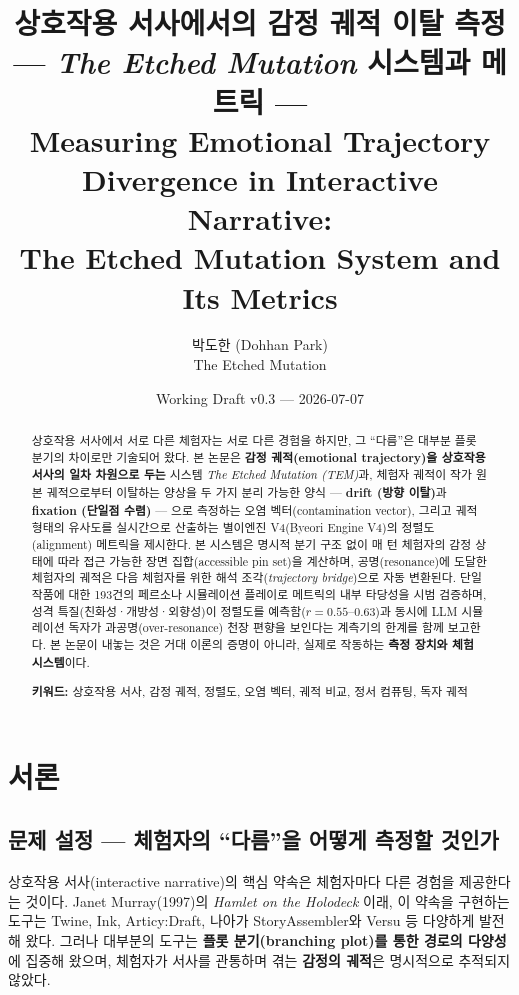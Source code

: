\documentclass[11pt, a4paper]{article}
\title{%
  상호작용 서사에서의 감정 궤적 이탈 측정\\
  \large --- \textit{The Etched Mutation} 시스템과 메트릭 ---\\[0.8em]
  \normalsize Measuring Emotional Trajectory Divergence in Interactive Narrative:\\
  The Etched Mutation System and Its Metrics
}
\author{박도한 (Dohhan Park)\\ \small The Etched Mutation}
\date{Working Draft v0.3 --- 2026-07-07}
\begin{document}
\maketitle

\begin{abstract}
\noindent 상호작용 서사에서 서로 다른 체험자는 서로 다른 경험을 하지만, 그 ``다름''은 대부분 플롯 분기의 차이로만 기술되어 왔다. 본 논문은 \textbf{감정 궤적(emotional trajectory)을 상호작용 서사의 일차 차원으로 두는} 시스템 \textit{The Etched Mutation (TEM)}과, 체험자 궤적이 작가 원본 궤적으로부터 이탈하는 양상을 두 가지 분리 가능한 양식 --- \textbf{drift (방향 이탈)}과 \textbf{fixation (단일점 수렴)} --- 으로 측정하는 오염 벡터(contamination vector), 그리고 궤적 형태의 유사도를 실시간으로 산출하는 별이엔진 V4(Byeori Engine V4)의 정렬도(alignment) 메트릭을 제시한다. 본 시스템은 명시적 분기 구조 없이 매 턴 체험자의 감정 상태에 따라 접근 가능한 장면 집합(accessible pin set)을 계산하며, 공명(resonance)에 도달한 체험자의 궤적은 다음 체험자를 위한 해석 조각(\textit{trajectory bridge})으로 자동 변환된다. 단일 작품에 대한 193건의 페르소나 시뮬레이션 플레이로 메트릭의 내부 타당성을 시범 검증하며, 성격 특질(친화성·개방성·외향성)이 정렬도를 예측함($r = 0.55$--$0.63$)과 동시에 LLM 시뮬레이션 독자가 과공명(over-resonance) 천장 편향을 보인다는 계측기의 한계를 함께 보고한다. 본 논문이 내놓는 것은 거대 이론의 증명이 아니라, 실제로 작동하는 \textbf{측정 장치와 체험 시스템}이다.

\medskip
\noindent\textbf{키워드:} 상호작용 서사, 감정 궤적, 정렬도, 오염 벡터, 궤적 비교, 정서 컴퓨팅, 독자 궤적
\end{abstract}

\section{서론}

\subsection{문제 설정 --- 체험자의 ``다름''을 어떻게 측정할 것인가}

상호작용 서사(interactive narrative)의 핵심 약속은 체험자마다 다른 경험을 제공한다는 것이다. Janet Murray(1997)의 \textit{Hamlet on the Holodeck} 이래, 이 약속을 구현하는 도구는 Twine, Ink, Articy:Draft, 나아가 StoryAssembler와 Versu 등 다양하게 발전해 왔다. 그러나 대부분의 도구는 \textbf{플롯 분기(branching plot)를 통한 경로의 다양성}에 집중해 왔으며, 체험자가 서사를 관통하며 겪는 \textbf{감정의 궤적}은 명시적으로 추적되지 않았다.
\end{document}

